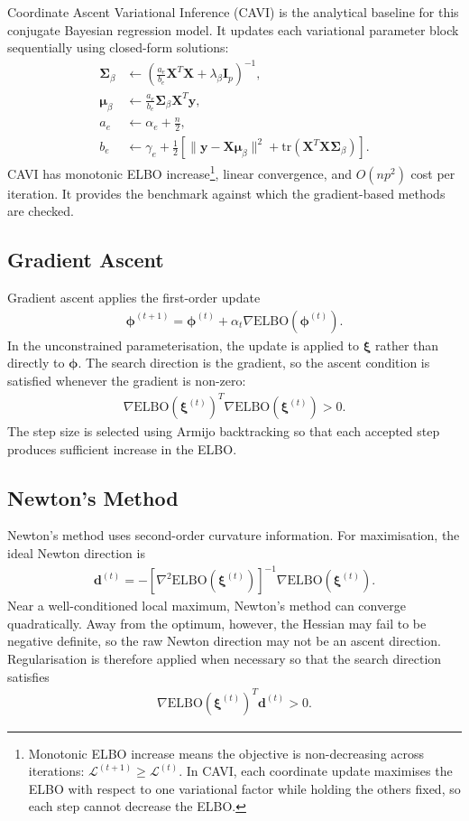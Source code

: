 \documentclass[11pt,a4paper]{article}
\newcommand{\ELBO}{\text{ELBO}}
\newcommand{\tr}{\text{tr}}
\begin{document}
Coordinate Ascent Variational Inference (CAVI) is the analytical baseline for this conjugate Bayesian regression model. It updates each variational parameter block sequentially using closed-form solutions:
\begin{align}
\bm{\Sigma}_\beta &\leftarrow \left(\frac{a_e}{b_e} \bm{X}^T\bm{X} + \lambda_\beta \bm{I}_p\right)^{-1},\\
\bm{\mu}_\beta &\leftarrow \frac{a_e}{b_e} \bm{\Sigma}_\beta \bm{X}^T\bm{y},\\
a_e &\leftarrow \alpha_e + \frac{n}{2},\\
b_e &\leftarrow \gamma_e + \frac{1}{2}\left[\|\bm{y} - \bm{X}\bm{\mu}_\beta\|^2 + \tr(\bm{X}^T\bm{X}\bm{\Sigma}_\beta)\right].
\end{align}
CAVI has monotonic ELBO increase\footnote{Monotonic ELBO increase means the objective is non-decreasing across iterations: $\mathcal{L}^{(t+1)} \geq \mathcal{L}^{(t)}$. In CAVI, each coordinate update maximises the ELBO with respect to one variational factor while holding the others fixed, so each step cannot decrease the ELBO.}, linear convergence, and $O(np^2)$ cost per iteration. It provides the benchmark against which the gradient-based methods are checked.

\subsection{Gradient Ascent}

Gradient ascent applies the first-order update
\begin{align}
\bm{\phi}^{(t+1)} = \bm{\phi}^{(t)} + \alpha_t \nabla\ELBO(\bm{\phi}^{(t)}).
\end{align}
In the unconstrained parameterisation, the update is applied to $\bm{\xi}$ rather than directly to $\bm{\phi}$. The search direction is the gradient, so the ascent condition is satisfied whenever the gradient is non-zero:
\begin{align}
\nabla\ELBO(\bm{\xi}^{(t)})^T \nabla\ELBO(\bm{\xi}^{(t)}) > 0.
\end{align}
The step size is selected using Armijo backtracking so that each accepted step produces sufficient increase in the ELBO.

\subsection{Newton's Method}

Newton's method uses second-order curvature information. For maximisation, the ideal Newton direction is
\begin{align}
\bm{d}^{(t)} = -[\nabla^2\ELBO(\bm{\xi}^{(t)})]^{-1}\nabla\ELBO(\bm{\xi}^{(t)}).
\end{align}
Near a well-conditioned local maximum, Newton's method can converge quadratically. Away from the optimum, however, the Hessian may fail to be negative definite, so the raw Newton direction may not be an ascent direction. Regularisation is therefore applied when necessary so that the search direction satisfies
\begin{align}
\nabla\ELBO(\bm{\xi}^{(t)})^T\bm{d}^{(t)} > 0.
\end{align}
\end{document}
